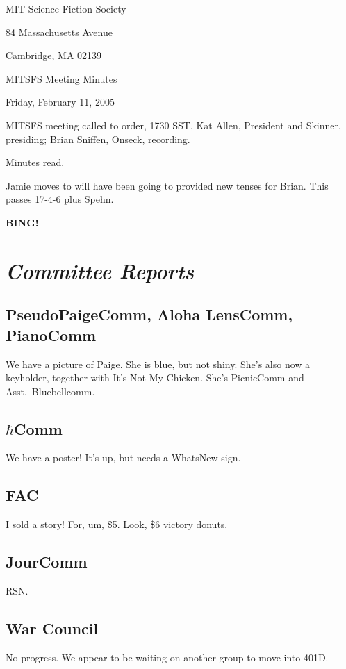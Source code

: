 \documentclass[10pt]{article}
\newcommand{\bing}{{\bf BING!} }
\newcommand{\goto}[1]{\bing \vskip 12pt \section*{{\em{#1}}}}
\newcommand{\ps}{ plus Spehn\xspace}
\begin{document}
\begin{center}

MIT Science Fiction Society

84 Massachusetts Avenue

Cambridge, MA 02139

\vspace{12pt}

MITSFS Meeting Minutes

Friday, February 11, 2005

\end{center}

\vspace{18pt}

\setlength{\parskip}{6pt}

\noindent
MITSFS meeting called to order, 1730 SST, Kat Allen, President and
Skinner, presiding; Brian Sniffen,  Onseck, recording.

Minutes read.

Jamie moves to will have been going to provided new tenses for Brian.
This passes 17-4-6\ps.

\goto{Committee Reports}
\subsection*{PseudoPaigeComm, Aloha LensComm, PianoComm}
We have a picture of Paige.  She is blue, but not shiny.  She's also
now a keyholder, together with It's Not My Chicken.  She's PicnicComm
and Asst.~Bluebellcomm.

\subsection*{$\hbar$Comm}
We have a poster!  It's up, but needs a WhatsNew sign.

\subsection*{FAC}
I sold a story!  For, um, \$5.  Look, \$6 victory donuts.

\subsection*{JourComm}
RSN.

\subsection*{War Council}
No progress.  We appear to be waiting on another group to move into 401D.
\end{document}
